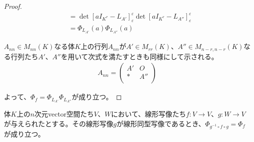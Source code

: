 \documentclass[dvipdfmx]{jsarticle}
\begin{document}
\begin{proof}
\begin{align*}
&= \det\left[ aI_{K^{r}} - L_{A'} \right]_{\varepsilon}^{\varepsilon}\det\left[ aI_{K^{r}} - L_{A''} \right]_{\varepsilon}^{\varepsilon}\\
&= \varPhi_{L_{A'}}(a)\varPhi_{L_{A''}}(a)
\end{align*}\par
$A_{nn} \in M_{nn}(K)$なる体$K$上の行列$A_{nn}$が$A' \in M_{rr}(K)$、$A'' \in M_{n - r,n - r}(K)$なる行列たち$A'$、$A''$を用いて次式を満たすときも同様にして示される。
\begin{align*}
A_{nn} = \begin{pmatrix}
A' & O \\
* & A'' \\
\end{pmatrix}
\end{align*}\par
よって、$\varPhi_{f} = \varPhi_{L_{A'}}\varPhi_{L_{A''}}$が成り立つ。
\end{proof}
\begin{thm}\label{2.2.2.9}
体$K$上の$n$次元vector空間たち$V$、$W$において、線形写像たち$f:V \rightarrow V$、$g:W \rightarrow V$が与えられたとする。その線形写像$g$が線形同型写像であるとき、$\varPhi_{g^{- 1} \circ f \circ g} = \varPhi_{f}$が成り立つ。
\end{thm}
\end{document}
